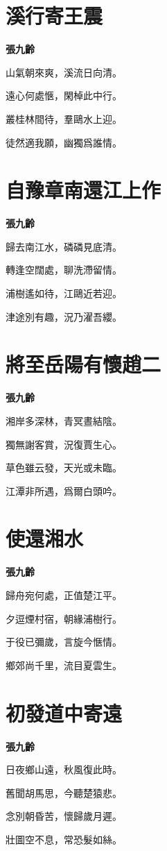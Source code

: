 \documentclass[12pt,a4paper]{ctexbook}
\begin{document}
\section{溪行寄王震}
\textbf{張九齡}\par\vspace{0.5em}
山氣朝來爽，溪流日向清。\par
遠心何處愜，閑棹此中行。\par
叢桂林間待，羣鷗水上迎。\par
徒然適我願，幽獨爲誰情。\par

\section{自豫章南還江上作}
\textbf{張九齡}\par\vspace{0.5em}
歸去南江水，磷磷見底清。\par
轉逢空闊處，聊洗滯留情。\par
浦樹遙如待，江鷗近若迎。\par
津途別有趣，況乃濯吾纓。\par

\section{將至岳陽有懷趙二}
\textbf{張九齡}\par\vspace{0.5em}
湘岸多深林，青冥晝結陰。\par
獨無謝客賞，況復賈生心。\par
草色雖云發，天光或未臨。\par
江潭非所遇，爲爾白頭吟。\par

\section{使還湘水}
\textbf{張九齡}\par\vspace{0.5em}
歸舟宛何處，正值楚江平。\par
夕逗煙村宿，朝緣浦樹行。\par
于役已彌歲，言旋今愜情。\par
鄉郊尚千里，流目夏雲生。\par

\section{初發道中寄遠}
\textbf{張九齡}\par\vspace{0.5em}
日夜鄉山遠，秋風復此時。\par
舊聞胡馬思，今聽楚猿悲。\par
念別朝昏苦，懷歸歲月遲。\par
壯圖空不息，常恐髮如絲。\par
\end{document}
